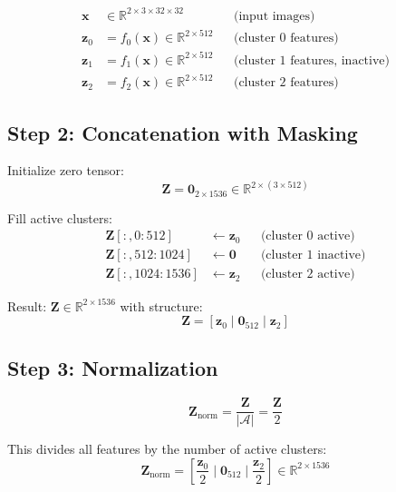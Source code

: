 \documentclass[11pt,a4paper]{article}
\newcommand{\R}{\mathbb{R}}
\begin{document}
\begin{align}
\mathbf{x} &\in \R^{2 \times 3 \times 32 \times 32} && \text{(input images)} \\
\mathbf{z}_0 &= f_0(\mathbf{x}) \in \R^{2 \times 512} && \text{(cluster 0 features)} \\
\mathbf{z}_1 &= f_1(\mathbf{x}) \in \R^{2 \times 512} && \text{(cluster 1 features, inactive)} \\
\mathbf{z}_2 &= f_2(\mathbf{x}) \in \R^{2 \times 512} && \text{(cluster 2 features)}
\end{align}

\subsection{Step 2: Concatenation with Masking}

Initialize zero tensor:
\begin{equation}
\mathbf{Z} = \mathbf{0}_{2 \times 1536} \in \R^{2 \times (3 \times 512)}
\end{equation}

Fill active clusters:
\begin{align}
\mathbf{Z}[:, 0:512] &\gets \mathbf{z}_0 && \text{(cluster 0 active)} \\
\mathbf{Z}[:, 512:1024] &\gets \mathbf{0} && \text{(cluster 1 inactive)} \\
\mathbf{Z}[:, 1024:1536] &\gets \mathbf{z}_2 && \text{(cluster 2 active)}
\end{align}

Result: $\mathbf{Z} \in \R^{2 \times 1536}$ with structure:
\begin{equation}
\mathbf{Z} = \left[\mathbf{z}_0 \mid \mathbf{0}_{512} \mid \mathbf{z}_2\right]
\end{equation}

\subsection{Step 3: Normalization}

\begin{equation}
\mathbf{Z}_{\text{norm}} = \frac{\mathbf{Z}}{|\mathcal{A}|} = \frac{\mathbf{Z}}{2}
\end{equation}

This divides all features by the number of active clusters:
\begin{equation}
\mathbf{Z}_{\text{norm}} = \left[\frac{\mathbf{z}_0}{2} \mid \mathbf{0}_{512} \mid \frac{\mathbf{z}_2}{2}\right] \in \R^{2 \times 1536}
\end{equation}
\end{document}
